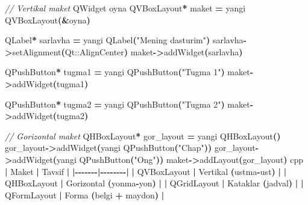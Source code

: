\documentclass[a4paper,11pt,twoside,openright]{book}
\newenvironment{Shaded}{\begin{snugshade}}{\end{snugshade}}
\newcommand{\CommentTok}[1]{\textcolor[rgb]{0.56,0.35,0.01}{\textit{#1}}}
\newcommand{\ErrorTok}[1]{\textcolor[rgb]{0.64,0.00,0.00}{\textbf{#1}}}
\newcommand{\ExtensionTok}[1]{#1}
\newcommand{\NormalTok}[1]{#1}
\newcommand{\OperatorTok}[1]{\textcolor[rgb]{0.81,0.36,0.00}{\textbf{#1}}}
\newcommand{\StringTok}[1]{\textcolor[rgb]{0.31,0.60,0.02}{#1}}
\begin{document}
\begin{Shaded}
\begin{Highlighting}[]
\CommentTok{// Vertikal maket}
\ExtensionTok{QWidget}\NormalTok{ oyna}
\ExtensionTok{QVBoxLayout}\OperatorTok{*}\NormalTok{ maket }\OperatorTok{=}\NormalTok{ yangi }\ExtensionTok{QVBoxLayout}\OperatorTok{(\&}\NormalTok{oyna}\OperatorTok{)}

\ExtensionTok{QLabel}\OperatorTok{*}\NormalTok{ sarlavha }\OperatorTok{=}\NormalTok{ yangi }\ExtensionTok{QLabel}\OperatorTok{(}\StringTok{"Mening dasturim"}\OperatorTok{)}
\NormalTok{sarlavha}\OperatorTok{{-}\textgreater{}}\NormalTok{setAlignment}\OperatorTok{(}\ExtensionTok{Qt::AlignCenter}\OperatorTok{)}
\NormalTok{maket}\OperatorTok{{-}\textgreater{}}\NormalTok{addWidget}\OperatorTok{(}\NormalTok{sarlavha}\OperatorTok{)}

\ExtensionTok{QPushButton}\OperatorTok{*}\NormalTok{ tugma1 }\OperatorTok{=}\NormalTok{ yangi }\ExtensionTok{QPushButton}\OperatorTok{(}\StringTok{"Tugma 1"}\OperatorTok{)}
\NormalTok{maket}\OperatorTok{{-}\textgreater{}}\NormalTok{addWidget}\OperatorTok{(}\NormalTok{tugma1}\OperatorTok{)}

\ExtensionTok{QPushButton}\OperatorTok{*}\NormalTok{ tugma2 }\OperatorTok{=}\NormalTok{ yangi }\ExtensionTok{QPushButton}\OperatorTok{(}\StringTok{"Tugma 2"}\OperatorTok{)}
\NormalTok{maket}\OperatorTok{{-}\textgreater{}}\NormalTok{addWidget}\OperatorTok{(}\NormalTok{tugma2}\OperatorTok{)}

\CommentTok{// Gorizontal maket}
\ExtensionTok{QHBoxLayout}\OperatorTok{*}\NormalTok{ gor\_layout }\OperatorTok{=}\NormalTok{ yangi }\ExtensionTok{QHBoxLayout}\OperatorTok{()}
\NormalTok{gor\_layout}\OperatorTok{{-}\textgreater{}}\NormalTok{addWidget}\OperatorTok{(}\NormalTok{yangi }\ExtensionTok{QPushButton}\OperatorTok{(}\StringTok{"Chap"}\OperatorTok{))}
\NormalTok{gor\_layout}\OperatorTok{{-}\textgreater{}}\NormalTok{addWidget}\OperatorTok{(}\NormalTok{yangi }\ExtensionTok{QPushButton}\OperatorTok{(}\StringTok{"O\textquotesingle{}ng"}\OperatorTok{))}
\NormalTok{maket}\OperatorTok{{-}\textgreater{}}\NormalTok{addLayout}\OperatorTok{(}\NormalTok{gor\_layout}\OperatorTok{)}
\ErrorTok{\textasciigrave{}\textasciigrave{}\textasciigrave{}}\NormalTok{cpp}
\OperatorTok{|}\NormalTok{ Maket }\OperatorTok{|}\NormalTok{ Tavsif }\OperatorTok{|}
\OperatorTok{|{-}{-}{-}{-}{-}{-}{-}|{-}{-}{-}{-}{-}{-}{-}{-}|}
\OperatorTok{|} \ErrorTok{\textasciigrave{}}\NormalTok{QVBoxLayout}\ErrorTok{\textasciigrave{}} \OperatorTok{|}\NormalTok{ Vertikal }\OperatorTok{(}\NormalTok{ustma}\OperatorTok{{-}}\NormalTok{ust}\OperatorTok{)} \OperatorTok{|}
\OperatorTok{|} \ErrorTok{\textasciigrave{}}\NormalTok{QHBoxLayout}\ErrorTok{\textasciigrave{}} \OperatorTok{|}\NormalTok{ Gorizontal }\OperatorTok{(}\NormalTok{yonma}\OperatorTok{{-}}\NormalTok{yon}\OperatorTok{)} \OperatorTok{|}
\OperatorTok{|} \ErrorTok{\textasciigrave{}}\NormalTok{QGridLayout}\ErrorTok{\textasciigrave{}} \OperatorTok{|}\NormalTok{ Kataklar }\OperatorTok{(}\NormalTok{jadval}\OperatorTok{)} \OperatorTok{|}
\OperatorTok{|} \ErrorTok{\textasciigrave{}}\NormalTok{QFormLayout}\ErrorTok{\textasciigrave{}} \OperatorTok{|}\NormalTok{ Forma }\OperatorTok{(}\NormalTok{belgi }\OperatorTok{+}\NormalTok{ maydon}\OperatorTok{)} \OperatorTok{|}


\end{Highlighting}
\end{Shaded}
\end{document}
